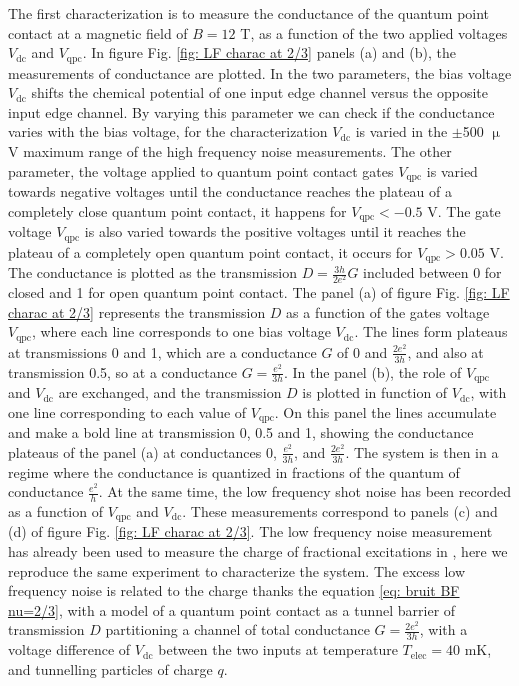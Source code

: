 The first characterization is to measure the conductance of the quantum point contact at a magnetic field of $B = 12$ T, as a function of the two applied voltages $V_{\mathrm{dc}}$ and $V_{\mathrm{qpc}}$.
In figure Fig. \ref{fig: LF charac at 2/3} panels (a) and (b), the measurements of conductance are plotted.
In the two parameters, the bias voltage $V_{\mathrm{dc}}$ shifts the chemical potential of one input edge channel versus the opposite input edge channel. 
By varying this parameter we can check if the conductance varies with the bias voltage, for the characterization $V_{\mathrm{dc}}$ is varied in the $\pm$500 $\upmu$V maximum range of the high frequency noise measurements.
The other parameter, the voltage applied to quantum point contact gates $V_{\mathrm{qpc}}$ is varied towards negative voltages until the conductance reaches the plateau of a completely close quantum point contact, it happens for $V_{\mathrm{qpc}} < -0.5$ V.
The gate voltage $V_{\mathrm{qpc}}$ is also varied towards the positive voltages until it reaches the plateau of a completely open quantum point contact, it occurs for $V_{\mathrm{qpc}} > 0.05$ V.
The conductance is plotted as the transmission $D = \frac{3h}{2e^{2}}G$ included between 0 for closed and 1 for open quantum point contact.
The panel (a) of figure Fig. \ref{fig: LF charac at 2/3} represents the transmission $D$ as a function of the gates voltage $V_{\mathrm{qpc}}$, where each line corresponds to one bias voltage $V_{\mathrm{dc}}$.
The lines form plateaus at transmissions 0 and 1, which are a conductance $G$ of 0 and $\frac{2e^{2}}{3h}$, and also at transmission 0.5, so at a conductance $G = \frac{e^{2}}{3h}$.
In the panel (b), the role of $V_{\mathrm{qpc}}$ and $V_{\mathrm{dc}}$ are exchanged, and the transmission $D$ is plotted in function of $V_{\mathrm{dc}}$, with one line corresponding to each value of $V_{\mathrm{qpc}}$.
On this panel the lines accumulate and make a bold line at transmission 0, 0.5 and 1, showing the conductance plateaus of the panel (a) at conductances 0, $\frac{e^{2}}{3h}$, and $\frac{2e^{2}}{3h}$.
The system is then in a regime where the conductance is quantized in fractions of the quantum of conductance $\frac{e^{2}}{h}$.
At the same time, the low frequency shot noise has been recorded as a function of $V_{\mathrm{qpc}}$ and $V_{\mathrm{dc}}$.
These measurements correspond to panels (c) and (d) of figure Fig. \ref{fig: LF charac at 2/3}.
The low frequency noise measurement has already been used to measure the charge of fractional excitations in \cite{saminadayar1997observation,de1998direct,reznikov1999observation,hashisaka2015shot}, here we reproduce the same experiment to characterize the system.
The excess low frequency noise is related to the charge thanks the equation \eqref{eq: bruit BF nu=2/3}, with a model of a quantum point contact as a tunnel barrier of transmission $D$ partitioning a channel of total conductance $G=\frac{2e^{2}}{3h}$, with a voltage difference of $V_{\mathrm{dc}}$ between the two inputs at temperature $T_{\mathrm{elec}} = 40$ mK, and tunnelling particles of charge $q$. 

